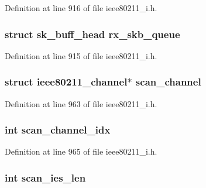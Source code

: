 Definition at line 916 of file ieee80211\-\_\-i.\-h.

\hypertarget{structieee80211__local_aac644577fe51ca03388b580ee634c471}{
\subsubsection[{rx\-\_\-skb\-\_\-queue}]{\setlength{\rightskip}{0pt plus 5cm}struct sk\-\_\-buff\-\_\-head rx\-\_\-skb\-\_\-queue}}\label{structieee80211__local_aac644577fe51ca03388b580ee634c471}


Definition at line 915 of file ieee80211\-\_\-i.\-h.

\hypertarget{structieee80211__local_a0fcd0e60e46da373ab6002985dfa2751}{
\subsubsection[{scan\-\_\-channel}]{\setlength{\rightskip}{0pt plus 5cm}struct ieee80211\-\_\-channel$\ast$ scan\-\_\-channel}}\label{structieee80211__local_a0fcd0e60e46da373ab6002985dfa2751}


Definition at line 963 of file ieee80211\-\_\-i.\-h.

\hypertarget{structieee80211__local_a047d647546c287f0ae0ab2b56b09ed66}{
\subsubsection[{scan\-\_\-channel\-\_\-idx}]{\setlength{\rightskip}{0pt plus 5cm}int scan\-\_\-channel\-\_\-idx}}\label{structieee80211__local_a047d647546c287f0ae0ab2b56b09ed66}


Definition at line 965 of file ieee80211\-\_\-i.\-h.

\hypertarget{structieee80211__local_a68131071a0fe62e850afc46f0a7ef6a1}{
\subsubsection[{scan\-\_\-ies\-\_\-len}]{\setlength{\rightskip}{0pt plus 5cm}int scan\-\_\-ies\-\_\-len}}\label{structieee80211__local_a68131071a0fe62e850afc46f0a7ef6a1}


